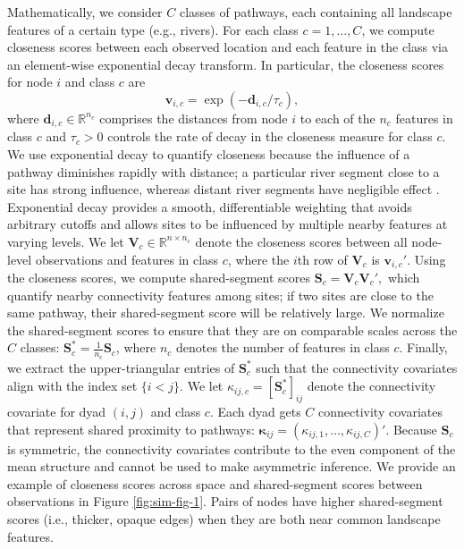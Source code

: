 \documentclass{article}
\begin{document}
Mathematically, we consider $C$ classes of pathways, each containing all landscape features of a certain type (e.g., rivers). For each class $c=1,\dots,C$, we compute closeness scores between each observed location and each feature in the class via an element-wise exponential decay transform. In particular, the closeness scores for node $i$ and class $c$ are
\begin{equation*}
    \mathbf{v}_{i,c}=\exp(-\mathbf{d}_{i,c}/\tau_c),
\end{equation*}
where $\mathbf{d}_{i,c}\in\mathbb{R}^{n_c}$ comprises the distances from node $i$ to each of the $n_c$ features in class $c$ and $\tau_c>0$ controls the rate of decay in the closeness measure for class $c$. We use exponential decay to quantify closeness because the influence of a pathway diminishes rapidly with distance; a particular river segment close to a site has strong influence, whereas distant river segments have negligible effect \citep{ward2002landscape}. Exponential decay provides a smooth, differentiable weighting that avoids arbitrary cutoffs and allows sites to be influenced by multiple nearby features at varying levels.
We let $\mathbf{V}_c\in\mathbb{R}^{n\times n_c}$ denote the closeness scores between all node-level observations and features in class $c$, where the $i$th row of $\mathbf{V}_c$ is $\mathbf{v}_{i,c}'$.
Using the closeness scores, we compute shared-segment scores $\mathbf{S}_c=\mathbf{V}_c\mathbf{V}_c',$ which quantify nearby connectivity features among sites; if two sites are close to the same pathway, their shared-segment score will be relatively large. We normalize the shared-segment scores  to ensure that they are on comparable scales across the $C$ classes: $\mathbf{S}^*_c=\frac{1}{n_c}\mathbf{S}_c$, where $n_c$ denotes the number of features in class $c$. Finally, we extract the upper-triangular entries of $\mathbf{S}^*_c$ such that the connectivity covariates align with the index set $\{i<j\}$. 
We let $\kappa_{ij,c}=[\mathbf{S}^*_c]_{ij}$ denote the connectivity covariate for dyad $(i,j)$ and class $c$. Each dyad gets $C$ connectivity covariates that represent shared proximity to pathways: $\boldsymbol\kappa_{ij}=(\kappa_{ij,1},\dots,\kappa_{ij,C})'.$
Because $\mathbf{S}_c$ is symmetric, the connectivity covariates contribute to the even component of the mean structure and cannot be used to make asymmetric inference.
We provide an example of closeness scores across space and shared-segment scores between observations in Figure \ref{fig:sim-fig-1}. Pairs of nodes have higher shared-segment scores (i.e., thicker, opaque edges) when they are both near common landscape features.
\end{document}
